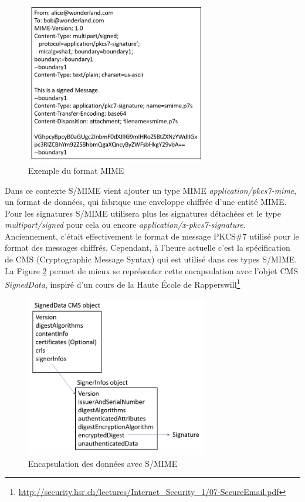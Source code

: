 \begin{figure}[h!]
	\includegraphics[width=8cm]{images/MIMESignExample.png}
	\centering
	\caption{Exemple du format MIME}
	\label{fig:MIMEExemple}
\end{figure}

Dans ce contexte S/MIME vient ajouter un type MIME \textit{application/pkcs7-mime}, un format de données, qui fabrique une enveloppe chiffrée d'une entité MIME. Pour les signatures S/MIME utilisera plus les signatures détachées et le type \textit{multipart/signed} pour cela ou encore \textit{application/x-pkcs7-signature}. Anciennement, c'était effectivement le format de message PKCS\#7 utilisé pour le format des messages chiffrés. Cependant, à l'heure actuelle c'est la spécification de CMS (Cryptographic Message Syntax) qui est utilisé dans ces types S/MIME. La Figure \ref{fig:SMIME_Encapsulation} permet de mieux se représenter cette encapsulation avec l'objet CMS \textit{SignedData}, inspiré d'un cours de la Haute École de Rapperswill\footnote{\url{http://security.hsr.ch/lectures/Internet_Security_1/07-SecureEmail.pdf}}

\begin{figure}[h!]
	\includegraphics[width=8cm]{images/MIMESignerDataExample.png}
	\centering
	\caption{Encapsulation des données avec S/MIME}
	\label{fig:SMIME_Encapsulation}
\end{figure}

